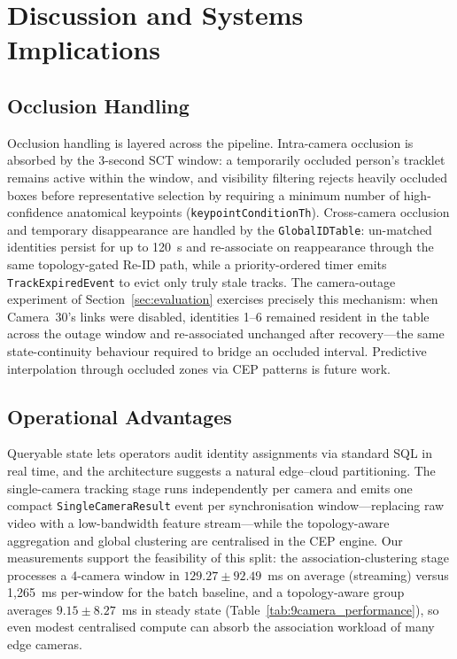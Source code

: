 \documentclass[conference]{IEEEtran}
\begin{document}
\section{Discussion and Systems Implications}
\label{sec:discussion}

\subsection{Occlusion Handling}
Occlusion handling is layered across the pipeline. Intra-camera occlusion is absorbed by the 3-second SCT window: a temporarily occluded person's tracklet remains active within the window, and visibility filtering rejects heavily occluded boxes before representative selection by requiring a minimum number of high-confidence anatomical keypoints (\texttt{keypointConditionTh}). Cross-camera occlusion and temporary disappearance are handled by the \texttt{GlobalIDTable}: un-matched identities persist for up to 120~s and re-associate on reappearance through the same topology-gated Re-ID path, while a priority-ordered timer emits \texttt{TrackExpiredEvent} to evict only truly stale tracks. The camera-outage experiment of Section~\ref{sec:evaluation} exercises precisely this mechanism: when Camera~30's links were disabled, identities 1--6 remained resident in the table across the outage window and re-associated unchanged after recovery---the same state-continuity behaviour required to bridge an occluded interval. Predictive interpolation through occluded zones via CEP patterns is future work.

\subsection{Operational Advantages}
Queryable state lets operators audit identity assignments via standard SQL in real time, and the architecture suggests a natural edge--cloud partitioning. The single-camera tracking stage runs independently per camera and emits one compact \texttt{SingleCameraResult} event per synchronisation window---replacing raw video with a low-bandwidth feature stream---while the topology-aware aggregation and global clustering are centralised in the CEP engine. Our measurements support the feasibility of this split: the association-clustering stage processes a 4-camera window in $129.27 \pm 92.49$~ms on average (streaming) versus 1{,}265~ms per-window for the batch baseline, and a topology-aware group averages $9.15 \pm 8.27$~ms in steady state (Table~\ref{tab:9camera_performance}), so even modest centralised compute can absorb the association workload of many edge cameras.
\end{document}
